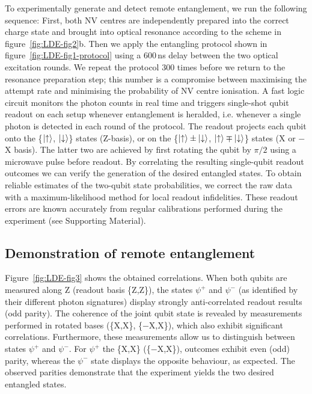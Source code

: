 To experimentally generate and detect remote entanglement, we run the following sequence: First, both NV centres are independently prepared into the correct charge state and brought into optical resonance according to the scheme in figure~\ref{fig:LDE-fig2}b. Then we apply the entangling protocol shown in figure~\ref{fig:LDE-fig1-protocol} using a 600$\,$ns delay between the two optical excitation rounds. We repeat the protocol 300 times before we return to the resonance preparation step; this number is a compromise between maximising the attempt rate and minimising the probability of NV centre ionisation. A fast logic circuit monitors the photon counts in real time and triggers single-shot qubit readout on each setup whenever entanglement is heralded, i.e. whenever a single photon is detected in each round of the protocol. The readout projects each qubit onto the \{$\left|\uparrow\right\rangle$, $\left|\downarrow\right\rangle$\} states (Z-basis), or on the \{$\left|\uparrow\right\rangle \pm \left|\downarrow\right\rangle$, $\left|\uparrow\right\rangle \mp \left|\downarrow\right\rangle$\} states (X or $-$X basis). The latter two are achieved by first rotating the qubit by $\pi/2$ using a microwave pulse before readout. By correlating the resulting single-qubit readout outcomes we can verify the generation of the desired entangled states. To obtain reliable estimates of the two-qubit state probabilities, we correct the raw data with a maximum-likelihood method for local readout infidelities. These readout errors are known accurately from regular calibrations performed during the experiment (see Supporting Material).

\subsection{Demonstration of remote entanglement}

Figure~\ref{fig:LDE-fig3} shows the obtained correlations. When both qubits are measured along Z (readout basis \{Z,Z\}), the states $\psi^+$ and $\psi^-$ (as identified by their different photon signatures) display strongly anti-correlated readout results (odd parity). The coherence of the joint qubit state is revealed by measurements performed in rotated bases (\{X,X\}, \{$-$X,X\}), which also exhibit significant correlations. Furthermore, these measurements allow us to distinguish between states $\psi^+$ and $\psi^-$. For $\psi^+$ the \{X,X\} (\{$-$X,X\}), outcomes exhibit even (odd) parity, whereas the $\psi^-$ state displays the opposite behaviour, as expected. The observed parities demonstrate that the experiment yields the two desired entangled states.

